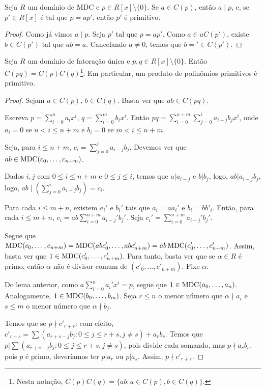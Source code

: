     \begin{corol}
        Seja $R$ um domínio de MDC e $p \in R[x]\setminus\{0\}$. Se $a \in C(p)$, então $a\mid p$, e, se $p'\in R[x]$ é tal que $p=ap'$, então $p'$ é primitivo.
    \end{corol}

    \begin{proof}
        Como já vimos $a\mid p$. Seja $p'$ tal que $p=ap'$. Como $a \in aC(p')$, existe $b \in C(p')$ tal que $ab=a$. Cancelando $a\neq 0$, temos que $b='\in C(p')$.
    \end{proof}

    \begin{prop}
        Seja $R$ um domínio de fatoração única e $p, q \in R[x]\setminus\{0\}$. Então $C(pq)=C(p)C(q)$\footnote{Nesta notação, $C(p)C(q)=\{ab: a \in C(p), b \in C(q)\}$.}.
        Em particular, um produto de polinômios primitivos é primitivo.
    \end{prop}

    \begin{proof}
        Sejam $a \in C(p)$, $b \in C(q)$. Basta ver que $ab \in C(pq)$.

        Escreva $p=\sum_{i=0}^n a_ix^i$, $q=\sum_{i=0}^m b_i x^i$. Então $pq=\sum_{i=0}^{n+m}\sum_{j=0}^{i}a_{i-j}b_jx^i$, onde $a_{i}=0$ se $n<i\leq n+m$ e $b_i=0$ se $m<i\leq n+m$.

        Seja, para $i\leq n+m$, $c_i=\sum_{j=0}^{i}a_{i-j}b_j$. Devemos ver que $ab \in \operatorname{MDC}(c_0, \dots, c_{n+m})$.

        Dados $i, j$ com $0\leq i\leq n+m$ e $0\leq j\leq i$, temos que $a|a_{i-j}$ e $b|b_j$, logo, $ab|a_{i-j}b_j$, logo, $ab\mid \left(\sum_{j=0}^{i}a_{i-j}b_j\right)=c_i$.

        Para cada $i\leq m+n$, existem $a_i'$ e $b_i'$ tais que $a_i=aa_i'$ e $b_i=bb'_i$.
        Então, para cada $i\leq m+n$, $c_i=ab\sum_{i=0}^{n+m}a_{i-j}'b_j'$.
        Seja $c_i'=\sum_{i=0}^{n+m}a_{i-j}'b_j'$.

        Segue que $\operatorname{MDC}(c_0, \dots, c_{n+m})=\operatorname{MDC}(abc'_0, \dots,abc_{n+m}')=ab\operatorname{MDC}(c'_0, \dots, c_{n+m}')$. Assim, basta ver que $1 \in \operatorname{MDC}(c'_0, \dots, c_{n+m}')$. Para tanto, basta ver que se $\alpha \in R$ é primo, então $\alpha$ não é divisor comum de $(c'_0, \dots, c'_{n+m})$.
        Fixe $\alpha$.

        Do lema anterior, como $a\sum_{i=0}^n a_i'x^i=p$, segue que $1\in \operatorname{MDC}(a_0, \dots, a_n)$.
        Analogamente, $1 \in \operatorname{MDC}(b_0, \dots, b_m)$.
        Seja $r\leq n$ o menor número que $\alpha\nmid a_i$ e $s\leq m$ o menor número que $\alpha \nmid b_j$.

        Temos que se $p\nmid c'_{r+s}$: com efeito, $c'_{r+s}=\sum(a_{r+s-j}b_j:0\leq j\leq r+s, j\neq s)+a_rb_s$. Temos que $p|\sum(a_{r+s-j}b_j:0\leq j\leq r+s, j\neq s)$, pois divide cada somando, mas $p\nmid a_rb_s$, pois $p$ é primo, deveríamos ter $p|a_r$ ou $p|a_s$. Assim, $p\nmid c'_{r+s}$.
    \end{proof}



